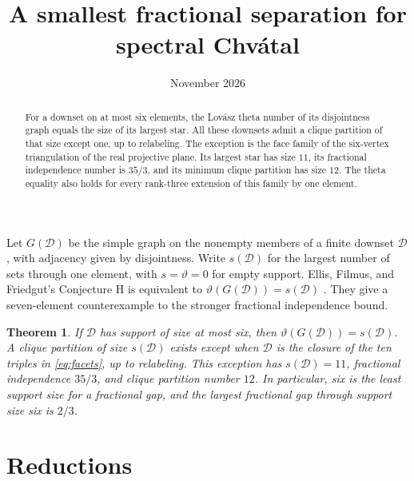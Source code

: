 \documentclass[10pt]{article}
\title{A smallest fractional separation for spectral Chv\'atal}
\author{}
\date{November 2026}
\newtheorem{theorem}{Theorem}
\begin{document}
\maketitle

\begin{abstract}
For a downset on at most six elements, the Lov\'asz theta number of its
disjointness graph equals the size of its largest star. All these downsets
admit a clique partition of that size except one, up to relabeling. The
exception is the face family of the six-vertex triangulation of the real
projective plane. Its largest star has size $11$, its fractional independence
number is $35/3$, and its minimum clique partition has size $12$. The theta
equality also holds for every rank-three extension of this family by one element.
\end{abstract}

Let $G(\mathcal D)$ be the simple graph on the nonempty members of a finite
downset $\mathcal D$, with adjacency given by disjointness. Write $s(\mathcal D)$
for the largest number of sets through one element, with $s=\vartheta=0$
for empty support. Ellis, Filmus, and
Friedgut's Conjecture H is equivalent to $\vartheta(G(\mathcal D))=s(\mathcal D)$
\cite{eff}. They give a seven-element counterexample to the stronger
fractional independence bound.

\begin{theorem}
If $\mathcal D$ has support of size at most six, then
$\vartheta(G(\mathcal D))=s(\mathcal D)$. A clique partition of size
$s(\mathcal D)$ exists except when $\mathcal D$ is the closure of the ten
triples in \eqref{eq:facets}, up to relabeling. This exception has
$s(\mathcal D)=11$, fractional independence $35/3$, and clique partition
number $12$. In particular, six is the least support size for a fractional
gap, and the largest fractional gap through support size six is $2/3$.
\end{theorem}

\section{Reductions}
\end{document}
